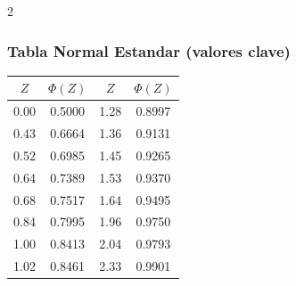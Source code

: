 \documentclass[11pt, a4paper]{article}
\begin{document}
\begin{multicols}{2}
\subsubsection*{Tabla Normal Estandar (valores clave)}
\begin{tabular}{cc|cc}
  \toprule
  $Z$ & $\Phi(Z)$ & $Z$ & $\Phi(Z)$ \\
  \midrule
  0.00 & 0.5000 & 1.28 & 0.8997 \\
  0.43 & 0.6664 & 1.36 & 0.9131 \\
  0.52 & 0.6985 & 1.45 & 0.9265 \\
  0.64 & 0.7389 & 1.53 & 0.9370 \\
  0.68 & 0.7517 & 1.64 & 0.9495 \\
  0.84 & 0.7995 & 1.96 & 0.9750 \\
  1.00 & 0.8413 & 2.04 & 0.9793 \\
  1.02 & 0.8461 & 2.33 & 0.9901 \\
  \bottomrule
\end{tabular}

\end{multicols}
\end{document}
